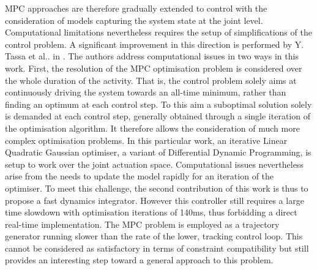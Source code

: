 MPC approaches are therefore gradually extended to control with the consideration of models capturing the system state at the joint level. Computational limitations nevertheless requires the setup of simplifications of the control problem. A significant improvement in this direction is performed by Y. Tassa et al.. in \cite{tassa2012synthesis}. The authors address computational issues in two ways in this work. First, the resolution of the MPC optimisation problem is considered over the whole duration of the activity. That is, the control problem solely aims at continuously driving the system towards an all-time minimum, rather than finding an optimum at each control step. To this aim a suboptimal solution solely is demanded at each control step, generally obtained through a single iteration of the optimisation algorithm. It therefore allows the consideration of much more complex optimisation problems. In this particular work, an iterative Linear Quadratic Gaussian optimiser, a variant of Differential Dynamic Programming, is setup to work over the joint actuation space. Computational issues nevertheless arise from the needs to update the model rapidly for an iteration of the optimiser. To meet this challenge, the second contribution of this work is thus to propose a fast dynamics integrator. However this controller still requires a large time slowdown with optimisation iterations of 140ms, thus forbidding a direct real-time implementation. The MPC problem is employed as a trajectory generator running slower than the rate of the lower, tracking control loop. This cannot be considered as satisfactory in terms of constraint compatibility but still provides an interesting step toward a general approach to this problem.

